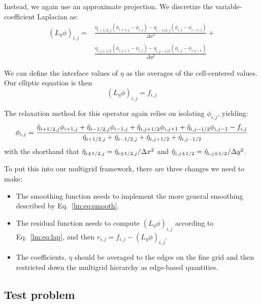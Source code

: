 
Instead, we again use an approximate projection.  We discretize the
variable-coefficient Laplacian as:
\begin{align}
(L_\eta \phi)_{i,j} = 
 & \frac{\eta_{i+1/2,j} (\phi_{i+1,j} - \phi_{i,j}) -
        \eta_{i-1/2,j} (\phi_{i,j} - \phi_{i-1,j})}{\Delta x^2} + \nonumber \\
 & \frac{\eta_{i,j+1/2} (\phi_{i,j+1} - \phi_{i,j}) -
        \eta_{i,j-1/2} (\phi_{i,j} - \phi_{i,j-1})}{\Delta y^2}
\label{lm:eq:lap}
\end{align}

We can define the interface values of $\eta$ as the averages of the
cell-centered values.  Our elliptic equation is then 
\begin{equation}
(L_\eta \phi)_{i,j} = f_{i,j}
\end{equation}

The relaxation method for this operator again relies on isolating
$\phi_{i,j}$, yielding:
\begin{equation}
\phi_{i,j} = \frac{\tilde{\eta}_{i+1/2,j}\phi_{i+1,j} + \tilde{\eta}_{i-1/2,j}\phi_{i-1,j} +
                   \tilde{\eta}_{i,j+1/2}\phi_{i,j+1} + \tilde{\eta}_{i,j-1/2}\phi_{i,j-1} -
                   f_{i,j} } 
                  {\tilde{\eta}_{i+1/2,j} + \tilde{\eta}_{i-1/2,j} + 
                   \tilde{\eta}_{i,j+1/2} + \tilde{\eta}_{i,j-1/2}}
\label{lm:eq:smooth}
\end{equation}
with the shorthand that $\tilde{\eta}_{i\pm1/2,j} = \tilde{\eta}_{i\pm1/2,j}/\Delta x^2$
and $\tilde{\eta}_{i,j\pm1/2} = \tilde{\eta}_{i,j\pm1/2}/\Delta y^2$.

To put this into our multigrid framework, there are three changes we
need to make:
\begin{itemize}
\item The smoothing function needs to implement the more general smoothing
described by Eq.~\ref{lm:eq:smooth}.

\item The residual function needs to compute $(L_\eta \phi)_{i,j}$ according
to Eq.~\ref{lm:eq:lap}, and then $r_{i,j} = f_{i,j} - (L_\eta \phi)_{i,j}$.

\item The coefficients, $\eta$ should be averaged to the edges on the fine
grid and then restricted down the multigrid hierarchy as edge-based 
quantities.
\end{itemize}

\subsection{Test problem}

